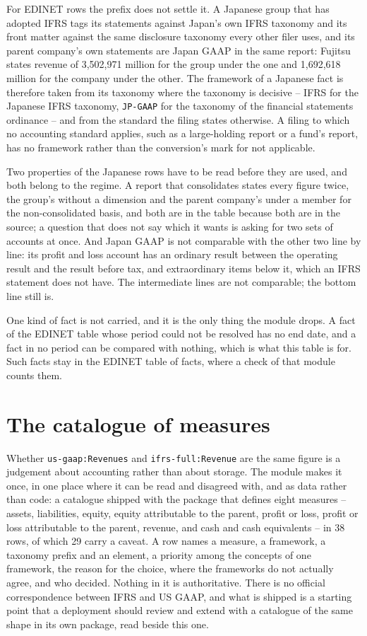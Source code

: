 For EDINET rows the prefix does not settle it. A Japanese group that has adopted IFRS tags its statements against Japan's own IFRS taxonomy and its front matter against the same disclosure taxonomy every other filer uses, and its parent company's own statements are Japan GAAP in the same report: Fujitsu states revenue of 3,502,971 million for the group under the one and 1,692,618 million for the company under the other. The framework of a Japanese fact is therefore taken from its taxonomy where the taxonomy is decisive -- IFRS for the Japanese IFRS taxonomy, \verb|JP-GAAP| for the taxonomy of the financial statements ordinance -- and from the standard the filing states otherwise. A filing to which no accounting standard applies, such as a large-holding report or a fund's report, has no framework rather than the conversion's mark for not applicable.

Two properties of the Japanese rows have to be read before they are used, and both belong to the regime. A report that consolidates states every figure twice, the group's without a dimension and the parent company's under a member for the non-consolidated basis, and both are in the table because both are in the source; a question that does not say which it wants is asking for two sets of accounts at once. And Japan GAAP is not comparable with the other two line by line: its profit and loss account has an ordinary result between the operating result and the result before tax, and extraordinary items below it, which an IFRS statement does not have. The intermediate lines are not comparable; the bottom line still is.

One kind of fact is not carried, and it is the only thing the module drops. A fact of the EDINET table whose period could not be resolved has no end date, and a fact in no period can be compared with nothing, which is what this table is for. Such facts stay in the EDINET table of facts, where a check of that module counts them.

\section{The catalogue of measures}

Whether \verb|us-gaap:Revenues| and \verb|ifrs-full:Revenue| are the same figure is a judgement about accounting rather than about storage. The module makes it once, in one place where it can be read and disagreed with, and as data rather than code: a catalogue shipped with the package that defines eight measures -- assets, liabilities, equity, equity attributable to the parent, profit or loss, profit or loss attributable to the parent, revenue, and cash and cash equivalents -- in 38 rows, of which 29 carry a caveat. A row names a measure, a framework, a taxonomy prefix and an element, a priority among the concepts of one framework, the reason for the choice, where the frameworks do not actually agree, and who decided. Nothing in it is authoritative. There is no official correspondence between IFRS and US GAAP, and what is shipped is a starting point that a deployment should review and extend with a catalogue of the same shape in its own package, read beside this one.

